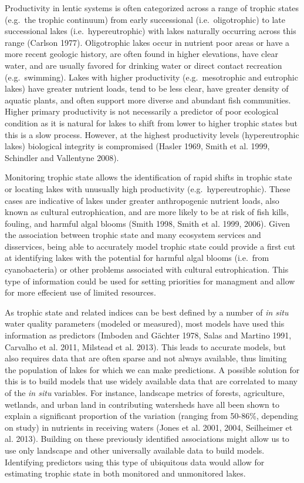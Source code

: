 \documentclass[11pt,]{article}
\begin{document}
Productivity in lentic systems is often categorized across a range of
trophic states (e.g.~the trophic continuum) from early successional
(i.e.~oligotrophic) to late successional lakes (i.e.~hypereutrophic)
with lakes naturally occurring across this range (Carlson 1977).
Oligotrophic lakes occur in nutrient poor areas or have a more recent
geologic history, are often found in higher elevations, have clear
water, and are usually favored for drinking water or direct contact
recreation (e.g.~swimming). Lakes with higher productivity
(e.g.~mesotrophic and eutrophic lakes) have greater nutrient loads, tend
to be less clear, have greater density of aquatic plants, and often
support more diverse and abundant fish communities. Higher primary
productivity is not necessarily a predictor of poor ecological condition
as it is natural for lakes to shift from lower to higher trophic states
but this is a slow process. However, at the highest productivity levels
(hypereutrophic lakes) biological integrity is compromised (Hasler 1969,
Smith et al. 1999, Schindler and Vallentyne 2008).

Monitoring trophic state allows the identification of rapid shifts in
trophic state or locating lakes with unusually high productivity
(e.g.~hypereutrophic). These cases are indicative of lakes under greater
anthropogenic nutrient loads, also known as cultural eutrophication, and
are more likely to be at risk of fish kills, fouling, and harmful algal
blooms (Smith 1998, Smith et al. 1999, 2006). Given the association
between trophic state and many ecosystem services and disservices, being
able to accurately model trophic state could provide a first cut at
identifying lakes with the potential for harmful algal blooms (i.e.~from
cyanobacteria) or other problems associated with cultural
eutrophication. This type of information could be used for setting
priorities for managment and allow for more effecient use of limited
resources.

As trophic state and related indices can be best defined by a number of
\emph{in situ} water quality parameters (modeled or measured), most
models have used this information as predictors (Imboden and G{ä}chter
1978, Salas and Martino 1991, Carvalho et al. 2011, Milstead et al.
2013). This leads to accurate models, but also requires data that are
often sparse and not always available, thus limiting the population of
lakes for which we can make predictions. A possible solution for this is
to build models that use widely available data that are correlated to
many of the \emph{in situ} variables. For instance, landscape metrics of
forests, agriculture, wetlands, and urban land in contributing
watersheds have all been shown to explain a significant proportion of
the variation (ranging from 50-86\%, depending on study) in nutrients in
receiving waters (Jones et al. 2001, 2004, Seilheimer et al. 2013).
Building on these previously identified associations might allow us to
use only landscape and other universally available data to build models.
Identifying predictors using this type of ubiquitous data would allow
for estimating trophic state in both monitored and unmonitored lakes.
\end{document}
